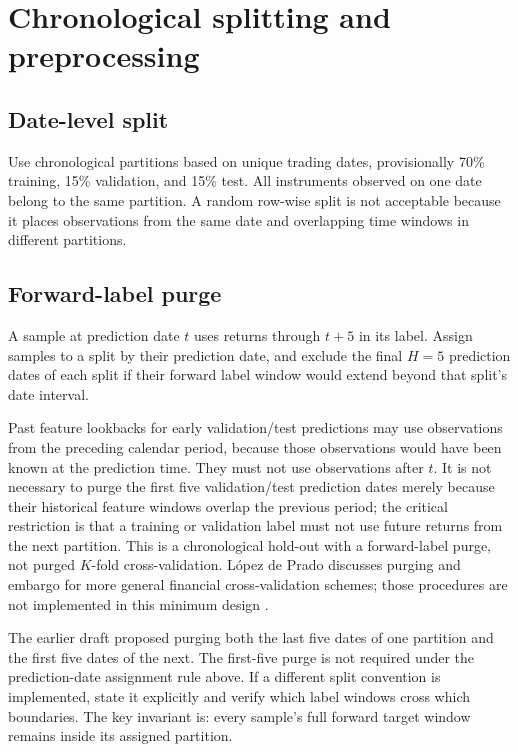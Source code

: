 \documentclass[11pt,a4paper]{article}
\begin{document}
\section{Chronological splitting and preprocessing}
\label{sec:split}

\subsection{Date-level split}

Use chronological partitions based on unique trading dates, provisionally 70\% training, 15\% validation, and 15\% test. All instruments observed on one date belong to the same partition. A random row-wise split is not acceptable because it places observations from the same date and overlapping time windows in different partitions.

\subsection{Forward-label purge}

A sample at prediction date $t$ uses returns through $t+5$ in its label. Assign samples to a split by their prediction date, and exclude the final $H=5$ prediction dates of each split if their forward label window would extend beyond that split's date interval.

Past feature lookbacks for early validation/test predictions may use observations from the preceding calendar period, because those observations would have been known at the prediction time. They must not use observations after $t$. It is not necessary to purge the first five validation/test prediction dates merely because their historical feature windows overlap the previous period; the critical restriction is that a training or validation label must not use future returns from the next partition. This is a chronological hold-out with a forward-label purge, not purged $K$-fold cross-validation. López de Prado discusses purging and embargo for more general financial cross-validation schemes; those procedures are not implemented in this minimum design \cite{LopezDePrado2018}.

\begin{warningbox}
The earlier draft proposed purging both the last five dates of one partition and the first five dates of the next. The first-five purge is not required under the prediction-date assignment rule above. If a different split convention is implemented, state it explicitly and verify which label windows cross which boundaries. The key invariant is: every sample's full forward target window remains inside its assigned partition.
\end{warningbox}
\end{document}
